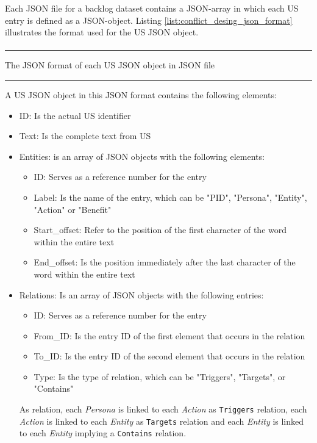 Each JSON file for a backlog dataset contains a JSON-array in which each US entry is defined as a JSON-object. Listing \ref{list:conflict_desing_json_format} illustrates the format used for the US JSON object.
\begin{MyListing}
	\paragraph{}
	\hrule
	\centering
	
	\caption{The JSON format of each US JSON object in JSON file}\label{list:conflict_desing_json_format}
	\hrule
\end{MyListing}
A US JSON object in this JSON format contains the following elements:
\begin{itemize}
	\item ID: Is the actual US identifier
	
	\item Text: Is the complete text from US
	
	\item Entities: is an array of JSON objects with the following elements:
	\begin{itemize}
		\item ID: Serves as a reference number for the entry
		
		\item Label: Is the name of the entry, which can be "PID", "Persona", "Entity", "Action" or "Benefit"
		
		\item Start\_offset: Refer to the position of the first character of the word within the entire text
		
		\item End\_offset: Is the position immediately after the last character of the word within the entire text
	\end{itemize}
	\item Relations: Is an array of JSON objects with the following entries:
	\begin{itemize}
		\item ID: Serves as a reference number for the entry
		
		\item From\_ID: Is the entry ID of the first element that occurs in the relation
		
		\item To\_ID: Is the entry ID of the second element that occurs in the relation
		
		\item Type: Is the type of relation, which can be "Triggers", "Targets", or "Contains"
	\end{itemize}
	As relation, each \emph{Persona} is linked to each \emph{Action} as \texttt{Triggers} relation, each \emph{Action} is linked to each \emph{Entity} as \texttt{Targets} relation and each \emph{Entity} is linked to each \emph{Entity} implying a \texttt{Contains} relation.
\end{itemize}
